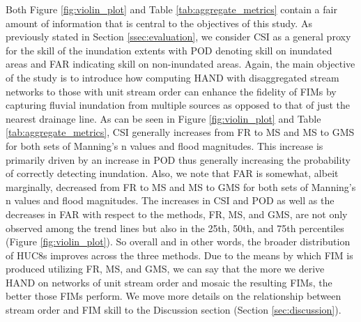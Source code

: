 Both Figure \ref{fig:violin_plot} and Table \ref{tab:aggregate_metrics} contain a fair amount of information that is central to the objectives of this study.
As previously stated in Section \ref{ssec:evaluation}, we consider CSI as a general proxy for the skill of the inundation extents with POD denoting skill on inundated areas and FAR indicating skill on non-inundated areas.
Again, the main objective of the study is to introduce how computing HAND with disaggregated stream networks to those with unit stream order can enhance the fidelity of FIMs by capturing fluvial inundation from multiple sources as opposed to that of just the nearest drainage line.
As can be seen in Figure \ref{fig:violin_plot} and Table \ref{tab:aggregate_metrics}, CSI generally increases from FR to MS and MS to GMS for both sets of Manning's n values and flood magnitudes.
This increase is primarily driven by an increase in POD thus generally increasing the probability of correctly detecting inundation.
Also, we note that FAR is somewhat, albeit marginally, decreased from FR to MS and MS to GMS for both sets of Manning's n values and flood magnitudes.
The increases in CSI and POD as well as the decreases in FAR with respect to the methods, FR, MS, and GMS, are not only observed among the trend lines but also in the 25th, 50th, and 75th percentiles (Figure \ref{fig:violin_plot}).
So overall and in other words, the broader distribution of HUC8s improves across the three methods.
Due to the means by which FIM is produced utilizing FR, MS, and GMS, we can say that the more we derive HAND on networks of unit stream order and mosaic the resulting FIMs, the better those FIMs perform.
We move more details on the relationship between stream order and FIM skill to the Discussion section (Section \ref{sec:discussion}).

